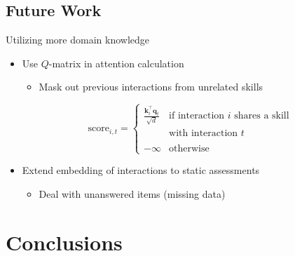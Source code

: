 \documentclass{beamer}
\newcommand{\vect}[1]{\boldsymbol{#1}}
\theoremstyle{definition}
\let\oldfootnotesize\footnotesize
\renewcommand*{\footnotesize}{\oldfootnotesize\tiny}
\begin{document}

\subsection{Future Work}

\begin{frame}{Utilizing more domain knowledge}
  \begin{itemize}
    \item Use $Q$-matrix in attention calculation
      \begin{itemize}
        \item Mask out previous interactions from unrelated skills
      \end{itemize}
      \[\text{score}_{i,t} = \begin{cases}
        \displaystyle\frac{\vect k_i^\top \vect q_t}{\sqrt{d}} & \text{if interaction } i \text{ shares a skill}\\ & \text{with interaction } t \\
        & \\ 
        -\infty & \text{otherwise}
      \end{cases}\]
\item<2-> Extend embedding of interactions to static assessments
  \begin{itemize}
    \item Deal with unanswered items (missing data) 
  \end{itemize}
  \end{itemize}
\end{frame}


\section{Conclusions}
\end{document}
